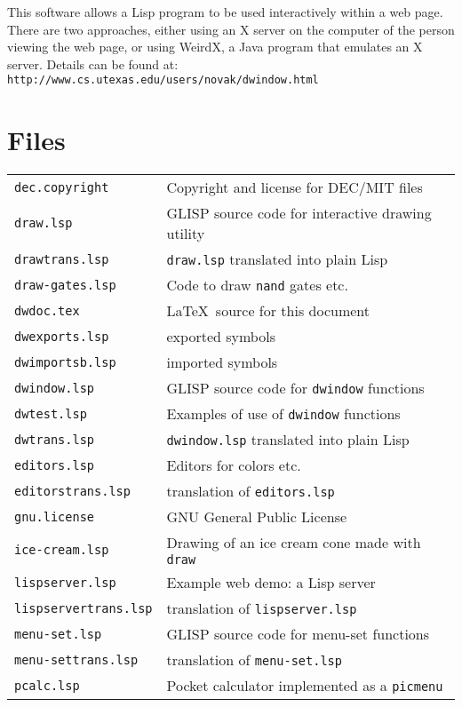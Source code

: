 This software allows a Lisp program to be used interactively within
a web page.  There are two approaches, either using an X server on
the computer of the person viewing the web page, or using WeirdX, a
Java program that emulates an X server.  Details can be found at:
{\tt http://www.cs.utexas.edu/users/novak/dwindow.html} 


\section{Files}

\begin{tabular}{ll}
{\tt dec.copyright}  & Copyright and license for DEC/MIT files \\
{\tt draw.lsp}       & GLISP source code for interactive drawing utility \\
{\tt drawtrans.lsp}  & {\tt draw.lsp} translated into plain Lisp \\
{\tt draw-gates.lsp} & Code to draw {\tt nand} gates etc. \\
{\tt dwdoc.tex}      & \LaTeX \ source for this document \\
{\tt dwexports.lsp}  & exported symbols \\
{\tt dwimportsb.lsp} & imported symbols \\
{\tt dwindow.lsp}    & GLISP source code for {\tt dwindow} functions \\
{\tt dwtest.lsp}     & Examples of use of {\tt dwindow} functions \\
{\tt dwtrans.lsp}    & {\tt dwindow.lsp} translated into plain Lisp \\
{\tt editors.lsp}    & Editors for colors etc. \\
{\tt editorstrans.lsp}    & translation of {\tt editors.lsp} \\
{\tt gnu.license}    & GNU General Public License \\
{\tt ice-cream.lsp}  & Drawing of an ice cream cone made with {\tt draw} \\
{\tt lispserver.lsp} & Example web demo: a Lisp server \\
{\tt lispservertrans.lsp}    & translation of {\tt lispserver.lsp} \\
{\tt menu-set.lsp}   & GLISP source code for menu-set functions \\
{\tt menu-settrans.lsp}   & translation of {\tt menu-set.lsp} \\
{\tt pcalc.lsp}      & Pocket calculator implemented as a {\tt picmenu} \\
\end{tabular}


